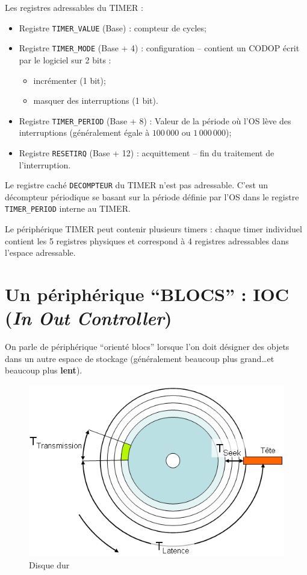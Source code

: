 \documentclass[11pt,english,french]{scrreprt}
\theoremstyle{remark}
\theoremstyle{definition}
\begin{document}
Les registres adressables du TIMER :\begin{itemize}
	\item Registre \lstinline!TIMER_VALUE! (Base) : compteur de cycles;
	\item Registre \lstinline!TIMER_MODE! (Base + 4) : configuration -- contient un CODOP écrit par le logiciel sur 2 bits :
	\begin{itemize}
		\item incrémenter (1 bit);
		\item masquer des interruptions (1 bit).
	\end{itemize}
	\item Registre \lstinline!TIMER_PERIOD! (Base + 8) : Valeur de la période où l'OS lève des interruptions (généralement égale à $100\, 000$ ou $1\, 000\, 000$);
	\item Registre \lstinline!RESETIRQ! (Base + 12) : acquittement -- fin du traitement de l'interruption.
\end{itemize}

Le registre caché \lstinline!DECOMPTEUR! du TIMER n'est pas adressable. C'est un décompteur périodique se basant sur la période définie par l'OS dans le registre \lstinline!TIMER_PERIOD! interne au TIMER.

\vspace{10pt}

Le périphérique TIMER peut contenir plusieurs timers : chaque timer individuel contient les 5 registres physiques et correspond à 4 registres adressables dans l'espace adressable.

\section{Un périphérique ``BLOCS'' : IOC (\emph{In Out Controller})} %

On parle de périphérique ``orienté blocs'' lorsque l'on doit désigner des objets dans un autre espace de stockage (généralement beaucoup plus grand\dots et beaucoup plus \textbf{lent}).

\begin{figure}[!h]
	\center
	\includegraphics[scale=.5]{diagrammes/Dd4}
	\caption{Disque dur}
\end{figure}
\end{document}
